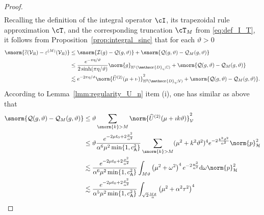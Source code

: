 \begin{proof}
\begin{equation}
\begin{aligned}
\end{aligned}
\end{equation}
Recalling the definition of the integral operator $\cI$, its trapezoidal rule approximation $\cT$, and the corresponding truncation $\cT_M$ from \eqref{eq:def_I_T}, it follows from Proposition~\ref{prop:integral_sinc}
that for each $\vartheta>0$ 
\begin{equation}
\begin{aligned}
	\snorm{
		\widetilde{\varepsilon}(\mathcal{V}_R)
		-
		{\varepsilon}^{(M)}(\mathcal{V}_R)
	}
	&
	\leq
	\snorm{
	       \mathcal{I}(g)
          -
           \mathcal{Q}(g,\vartheta)
	}
	+
	\snorm{
	       \mathcal{Q}(g,\vartheta)
     	-
        \mathcal{Q}_M(g,\vartheta)
	}
	\\
	&
	\leq
    \frac{
        e^{-\pi \eta/ \vartheta}
    }{
        2\sinh(\pi \eta/\vartheta)
    }
    \norm{g}_{\mathbb{H}^1(\mathscr{D}_\eta;\mathbb{C})}
   +
	\snorm{
	       \mathcal{Q}(g,\vartheta)
     	-
        \mathcal{Q}_M(g,\vartheta)
	}
	\\
	&
	\lesssim
    e^{- 2 \pi \eta / \vartheta}
   	\norm{
			\widehat{U}^{(2)}(\mu+\imath \cdot) 
	}^2_{\mathbb{H}^2(\mathscr{D}_\eta;\mathcal{V})}
    +
   	\snorm{
	       \mathcal{Q}(g,\vartheta)
     	-
        \mathcal{Q}_M(g,\vartheta)
	}.
\end{aligned}
\end{equation}
According to Lemma~\ref{lmm:regularity_U_n} item (i), one has similar as above that
\begin{equation}
\begin{aligned}
	\snorm{
	       \mathcal{Q}(g,\vartheta)
     	-
        \mathcal{Q}_M(g,\vartheta)
	}
	&
	\leq
	\vartheta
	\sum_{\snorm{k} > M}
	\norm{
			\widehat{U}^{(2)}(\mu+\imath k\vartheta ) 
	}^2_{\mathcal{V}}
	\\
	&
	\leq
	\vartheta
	\frac{e^{-2\mu t_0+2\frac{\mu^2}{\alpha^2}}}{\alpha^6 \mu^2 \min\{1, c^2_{\mathsf{A}}\} }
	\sum_{\snorm{k} > M}
    (\mu^2 + k^2 \vartheta^2)^4
	e^{-2\frac{ k^2 \vartheta^2}{\alpha^2}}
	\norm{p}^2_\mathcal{H}
	\\
	&
	\lesssim
	\frac{e^{-2\mu t_0+2\frac{\mu^2}{\alpha^2}}}{\alpha^6 \mu^2 \min\{1, c^2_{\mathsf{A}}\}}
	\int_{M\vartheta} 
	\left(\mu^2+\omega^2\right)^4
	e^{-2\frac{ \omega^2}{\alpha^2}}
	\text{d} \omega
    \norm{p}^2_\mathcal{H}
	\\
	&
	\lesssim
	\frac{e^{-2\mu t_0+2\frac{\mu^2}{\alpha^2}}}{\alpha^5 \mu^2 \min\{1, c^2_{\mathsf{A}}\}}
	\int_{\sqrt{2}\frac{M\vartheta}{\alpha}} 
	\left(\mu^2+\alpha^2\tau^2\right)^4

\end{aligned}
\end{equation}
\end{proof}
